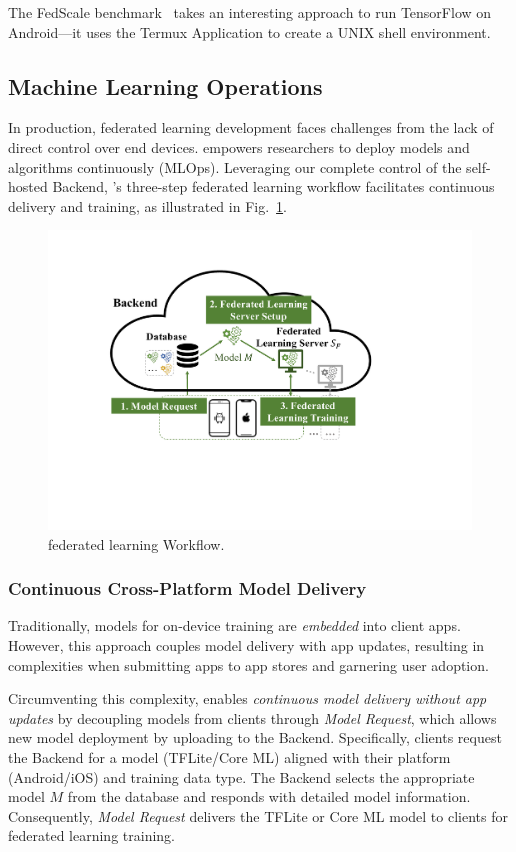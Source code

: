 The FedScale benchmark~\cite{lai2022fedscale} takes an interesting approach to
run TensorFlow on Android---it uses the Termux Application to
create a UNIX shell environment.

\subsection{Machine Learning Operations}
\label{sec:mlops}

\newcommand{\model}{$M$}
\newcommand{\fs}{$S_\mathrm F$}
In production,
federated learning development faces challenges from
the lack of direct control over end devices.
\fedkit empowers researchers to deploy models and algorithms continuously (MLOps).
Leveraging our complete control of the self-hosted Backend,
\fedkit's three-step federated learning workflow
facilitates continuous delivery and training,
as illustrated in Fig.~\ref{fig:fl-workflow}.

\begin{figure}\begin{center}
    \includegraphics[width=0.7\linewidth]{fl_workflow.pdf}
    \caption{\fedkit federated learning Workflow.}
    \label{fig:fl-workflow}
\end{center}\end{figure}

\subsubsection{Continuous Cross-Platform Model Delivery}
Traditionally, models for on-device training are \textit{embedded} into client apps.
However, this approach couples model delivery with app updates,
resulting in complexities when submitting apps to app stores and garnering user adoption.

Circumventing this complexity,
\fedkit enables \textit{continuous model delivery without app updates} by
decoupling models from clients through \textit{Model Request},
which allows new model deployment by uploading to the Backend.
Specifically, clients request the Backend for a model (TFLite/Core ML)
aligned with
their platform (Android/iOS) and training data type.
The Backend selects the appropriate model \model{} from the database and
responds with detailed model information.
Consequently, \textit{Model Request} delivers the TFLite or Core ML model
to clients for federated learning training.

